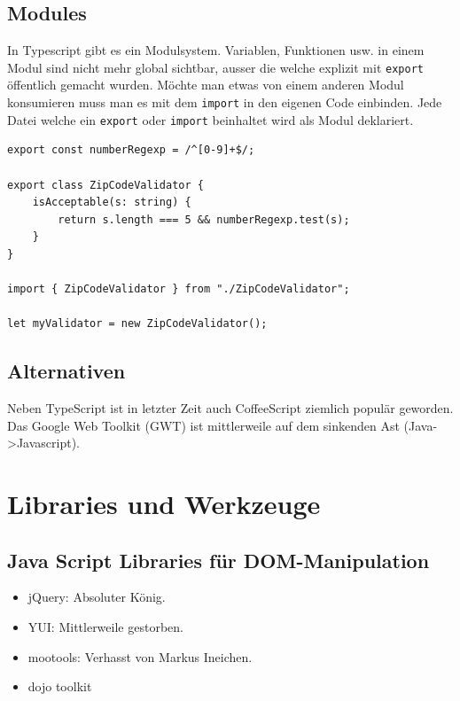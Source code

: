 \newpage

\subsection{Modules}

In Typescript gibt es ein Modulsystem. Variablen, Funktionen usw. in einem Modul sind nicht mehr global sichtbar, ausser die welche explizit mit \lstinline|export| öffentlich gemacht wurden. Möchte man etwas von einem anderen Modul konsumieren muss man es mit dem \lstinline|import| in den eigenen Code einbinden. Jede Datei welche ein \lstinline|export| oder \lstinline|import| beinhaltet wird als Modul deklariert. 

\begin{lstlisting}[label=lst:typescript-modules,caption=Modules]
export const numberRegexp = /^[0-9]+$/;

export class ZipCodeValidator {
	isAcceptable(s: string) {
		return s.length === 5 && numberRegexp.test(s);
	}
}

import { ZipCodeValidator } from "./ZipCodeValidator";

let myValidator = new ZipCodeValidator();
\end{lstlisting}

\subsection{Alternativen}
Neben TypeScript ist in letzter Zeit auch CoffeeScript ziemlich populär geworden. Das Google Web Toolkit (GWT) ist mittlerweile auf dem sinkenden Ast (Java->Javascript).

\section{Libraries und Werkzeuge}

\subsection{Java Script Libraries für DOM-Manipulation}
\begin{itemize}
	\item jQuery: Absoluter König.
	\item YUI: Mittlerweile gestorben.
	\item mootools: Verhasst von Markus Ineichen.
	\item dojo toolkit
\end{itemize}


